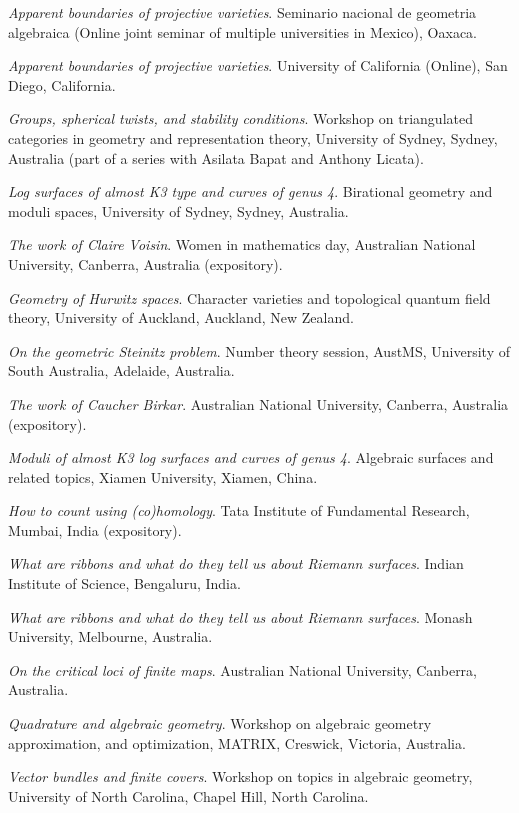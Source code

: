 \documentclass[11pt]{article}
\begin{document}
\begin{description}
\emph{Apparent boundaries of projective varieties}.
Seminario nacional de geometria algebraica (Online joint seminar of multiple universities in Mexico), Oaxaca.

\emph{Apparent boundaries of projective varieties}.
University of California (Online), San Diego, California.
\item[{2019}] \emph{Groups, spherical twists, and stability conditions}.
Workshop on triangulated categories in geometry and representation theory, University of Sydney, Sydney, Australia (part of a series with Asilata Bapat and Anthony Licata).

\emph{Log surfaces of almost K3 type and curves of genus 4}.
Birational geometry and moduli spaces, University of Sydney, Sydney, Australia.

\emph{The work of Claire Voisin}.
Women in mathematics day, Australian National University, Canberra, Australia (expository).
\item[{2018}] \emph{Geometry of Hurwitz spaces}.
Character varieties and topological quantum field theory, University of Auckland, Auckland, New Zealand.

\emph{On the geometric Steinitz problem}.
Number theory session,  AustMS, University of South Australia, Adelaide, Australia.

\emph{The work of Caucher Birkar}.
Australian National University, Canberra, Australia (expository).

\emph{Moduli of almost K3 log surfaces and curves of genus 4}.
Algebraic surfaces and related topics, Xiamen University, Xiamen, China.

\emph{How to count using (co)homology}.
Tata Institute of Fundamental Research, Mumbai, India (expository).

\emph{What are ribbons and what do they tell us about Riemann surfaces}.
Indian Institute of Science, Bengaluru, India.

\emph{What are ribbons and what do they tell us about Riemann surfaces}.
Monash University, Melbourne, Australia.

\emph{On the critical loci of finite maps}.
Australian National University, Canberra, Australia.

\emph{Quadrature and algebraic geometry}.
Workshop on algebraic geometry approximation, and optimization, MATRIX, Creswick, Victoria, Australia.
\item[{2017}] \emph{Vector bundles and finite covers}.
Workshop on topics in algebraic geometry, University of North Carolina, Chapel Hill, North Carolina.


\end{description}
\end{document}
